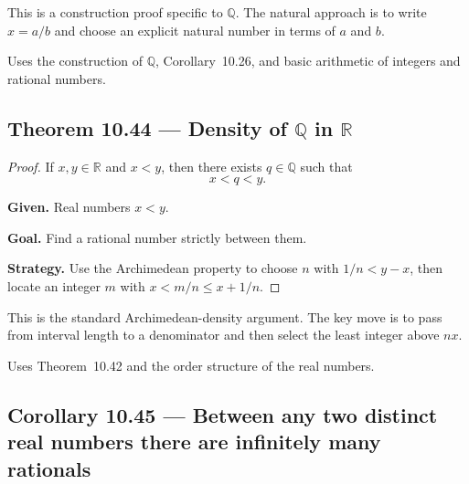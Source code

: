 \begin{remark*}
This is a construction proof specific to $\mathbb{Q}$.  The natural approach is
to write $x=a/b$ and choose an explicit natural number in terms of $a$ and $b$.
\end{remark*}

\begin{remark*}[Dependencies]
Uses the construction of $\mathbb{Q}$, Corollary~10.26, and basic arithmetic of
integers and rational numbers.
\end{remark*}


\subsection*{Theorem 10.44 — Density of $\mathbb{Q}$ in $\mathbb{R}$}
\label{prf:grep-density-q-in-r}

\begin{proof}
\Claim If $x,y \in \mathbb{R}$ and $x<y$, then there exists $q \in \mathbb{Q}$ such that
\[
x < q < y.
\]

\textbf{Given.} Real numbers $x<y$.

\textbf{Goal.} Find a rational number strictly between them.

\textbf{Strategy.} Use the Archimedean property to choose $n$ with $1/n < y-x$, then locate an integer $m$ with $x < m/n \le x+1/n$.


\end{proof}

\begin{remark*}
This is the standard Archimedean-density argument.  The key move is to pass
from interval length to a denominator and then select the least integer above
$nx$.
\end{remark*}

\begin{remark*}[Dependencies]
Uses Theorem~10.42 and the order structure of the real numbers.
\end{remark*}


\subsection*{Corollary 10.45 — Between any two distinct real numbers there are infinitely many rationals}
\label{prf:grep-infinitely-many-rationals}


